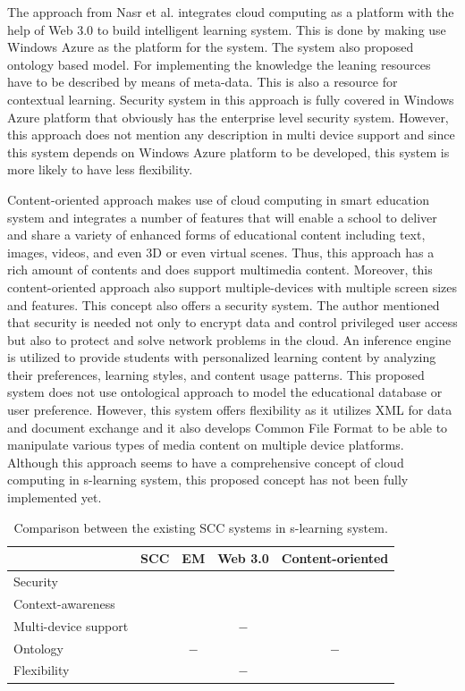 \documentclass[journal]{vgtc}
\newcommand{\cmark}{\ding{51}}%
\begin{document}
The approach from Nasr et al. \cite{nasr2012proposed} integrates cloud computing as a platform with the help of Web 3.0 to build intelligent learning system. This is done by making use Windows Azure as the platform for the system. The system also proposed ontology based model. For implementing the knowledge the leaning resources have to be described by means of meta-data. This is also a resource for contextual learning. Security system in this approach is fully covered in Windows Azure platform that obviously has the enterprise level security system. However, this approach does not mention any description in multi device support and since this system depends on Windows Azure platform to be developed, this system is more likely to have less flexibility.

Content-oriented approach \cite{jeong2013content} makes use of cloud computing in smart education system and integrates a number of features that will enable a school to deliver and share a variety of enhanced forms of educational content including text, images, videos, and even 3D or even virtual scenes. Thus, this approach has a rich amount of contents and does support multimedia content. Moreover, this content-oriented approach also support multiple-devices with multiple screen sizes and features. This concept also offers a security system. The author mentioned that security is needed not only to encrypt data and control privileged user access but also to protect and solve network problems in the cloud. An inference engine is utilized to provide students with personalized learning content by analyzing their preferences, learning styles, and content usage patterns. This proposed system does not use ontological approach to model the educational database or user preference. However, this system offers flexibility as it utilizes XML for data and document exchange and it also develops Common File Format to be able to manipulate various types of media content on multiple device platforms. Although this approach seems to have a comprehensive concept of cloud computing in s-learning system, this proposed concept has not been fully implemented yet.

\begin{table}[htb]
  \caption{Comparison between the existing SCC systems in s-learning system.}
  \label{tab:comparison}
  \scriptsize
  \begin{center}
  \begin{tabular}{lcccc}
     & SCC & EM & Web 3.0 & Content-oriented \\
    \hline
    Security & \cmark & \cmark & \cmark & \cmark \\
    Context-awareness & \cmark & \cmark & \cmark & \cmark \\
    Multi-device support & \cmark & \cmark & $-$ & \cmark \\
    Ontology & \cmark & $-$ & \cmark &  $-$ \\
    Flexibility & \cmark & \cmark &  $-$ & \cmark
  \end{tabular}
  \end{center}
\end{table}
\end{document}
